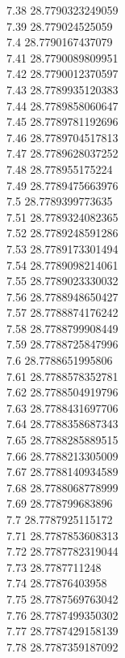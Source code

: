{7.38	28.7790323249059\\
7.39	28.779024525059\\
7.4	28.7790167437079\\
7.41	28.7790089809951\\
7.42	28.7790012370597\\
7.43	28.7789935120383\\
7.44	28.7789858060647\\
7.45	28.7789781192696\\
7.46	28.7789704517813\\
7.47	28.7789628037252\\
7.48	28.778955175224\\
7.49	28.7789475663976\\
7.5	28.7789399773635\\
7.51	28.7789324082365\\
7.52	28.7789248591286\\
7.53	28.7789173301494\\
7.54	28.7789098214061\\
7.55	28.7789023330032\\
7.56	28.7788948650427\\
7.57	28.7788874176242\\
7.58	28.7788799908449\\
7.59	28.7788725847996\\
7.6	28.7788651995806\\
7.61	28.7788578352781\\
7.62	28.7788504919796\\
7.63	28.7788431697706\\
7.64	28.7788358687343\\
7.65	28.7788285889515\\
7.66	28.7788213305009\\
7.67	28.7788140934589\\
7.68	28.7788068778999\\
7.69	28.778799683896\\
7.7	28.7787925115172\\
7.71	28.7787853608313\\
7.72	28.7787782319044\\
7.73	28.7787711248\\
7.74	28.77876403958\\
7.75	28.7787569763042\\
7.76	28.7787499350302\\
7.77	28.7787429158139\\
7.78	28.7787359187092\\
}

